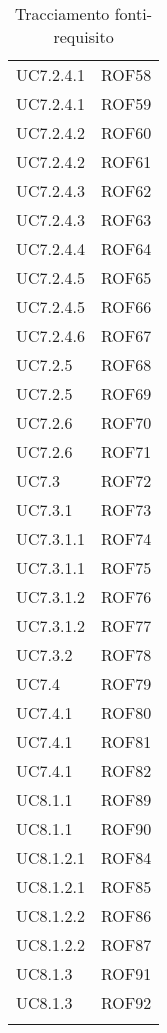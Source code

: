 \documentclass[../AnalisiDeiRequisiti.tex]{subfiles}
\begin{document}
\begin{longtable}{p{4cm}!{\VRule[1pt]}p{4cm}}
UC7.2.4.1 & ROF58 \\
UC7.2.4.1 & ROF59 \\
UC7.2.4.2 & ROF60 \\
UC7.2.4.2 & ROF61 \\
UC7.2.4.3 & ROF62 \\
UC7.2.4.3 & ROF63 \\
UC7.2.4.4 & ROF64 \\
UC7.2.4.5 & ROF65 \\
UC7.2.4.5 & ROF66 \\
UC7.2.4.6 & ROF67 \\
UC7.2.5 & ROF68 \\
UC7.2.5 & ROF69 \\
UC7.2.6 & ROF70 \\
UC7.2.6 & ROF71 \\
UC7.3 & ROF72 \\
UC7.3.1 & ROF73 \\
UC7.3.1.1 & ROF74 \\
UC7.3.1.1 & ROF75 \\
UC7.3.1.2 & ROF76 \\
UC7.3.1.2 & ROF77 \\
UC7.3.2 & ROF78 \\
UC7.4 & ROF79 \\
UC7.4.1 & ROF80 \\
UC7.4.1 & ROF81 \\
UC7.4.1 & ROF82 \\
UC8.1.1 & ROF89 \\
UC8.1.1 & ROF90 \\
UC8.1.2.1 & ROF84 \\
UC8.1.2.1 & ROF85 \\
UC8.1.2.2 & ROF86 \\
UC8.1.2.2 & ROF87 \\
UC8.1.3 & ROF91 \\
UC8.1.3 & ROF92 \\
\caption{Tracciamento fonti-requisito}
\end{longtable}
		
\newpage
\end{document}
